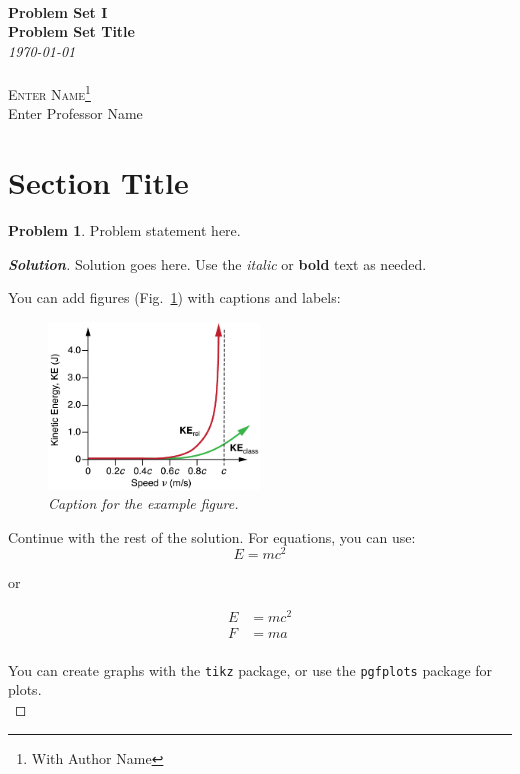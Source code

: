 \documentclass[12pt]{article}
\newcommand{\SheetTitle}[3]{
  {\noindent\Huge\bf  \\[0.5\baselineskip] {\fontfamily{cmr}\selectfont  Problem Set I}}\\[2\baselineskip] %
  { {\bf \fontfamily{cmr}\selectfont #1}\\ {\textit{\fontfamily{cmr}\selectfont \today}}}    ~~~~~~~~~~~~~~~~~~~~~~~~~~~~~~~~~~~~~~~~~~~~~~~~~~~~~~~~~~~~~~~~~~~~     {\large \textsc{Enter Name}\thanks{With #3}} \\
  {Enter Professor Name}
  \\[1.4\baselineskip]}
\theoremstyle{definition}
\newtheorem{p}{Problem}
\newenvironment{solution}
  {\begin{mdframed}[linewidth=0.5pt, roundcorner=10pt, linecolor=black]\begin{proof}[\bfseries Solution]}
  {\qedhere\end{proof}\end{mdframed}}
\begin{document}
\SheetTitle{Problem Set Title}{Course Name}{Author Name}

\section{Section Title}

\vspace{0.9cm}
\begin{p}
  Problem statement here.
\end{p}

\begin{solution}
  Solution goes here. Use the \emph{italic} or \textbf{bold} text as needed.
  
  You can add figures (Fig.~\ref{fig:example}) with captions and labels:
  \begin{figure}[H]
    \centering
    \includegraphics[width=0.5\textwidth]{figures/example.jpg}
    \caption{\emph{Caption for the example figure.}}
    \label{fig:example}
  \end{figure}

  Continue with the rest of the solution. For equations, you can use:
  \begin{equation}
    E = mc^2
  \end{equation}

  or 

  \begin{align*}
    E &= mc^2 \\
    F &= ma
  \end{align*} \\

  You can create graphs with the \texttt{tikz} package, or use the \texttt{pgfplots} package for plots.\\


\end{solution}
\end{document}
